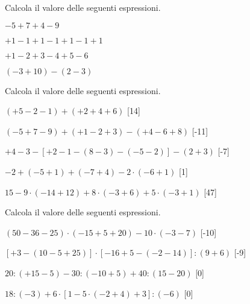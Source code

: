 \begin{esercizio}
Calcola il valore delle seguenti espressioni.
 \begin{multicols}{2}
 \begin{enumeratea}
 \item \(-5+7+4-9\)
 \item \(+1-1+1-1+1-1+1\)
 \item \(+1-2+3-4+5-6\)
 \item \((-3+10)-(2-3)\)
 \end{enumeratea}
 \end{multicols}
\end{esercizio}

\begin{esercizio} %
Calcola il valore delle seguenti espressioni.
 \begin{enumeratea}
 \item \((+5-2-1)+(+2+4+6)\) \hfill[14]
 \item \((-5+7-9)+(+1-2+3)-(+4-6+8)\) \hfill[-11]
 \item \(+4-3-[+2-1-(8-3)-(-5-2)]-(2+3)\) \hfill[-7]
 \item \(-2+(-5+1)+(-7+4)-2 \cdot (-6+1)\) \hfill[1]
 \item \(15-9 \cdot (-14+12)+8 \cdot (-3+6)+ 5 \cdot(-3+1)\) \hfill[47]
 \end{enumeratea}
\end{esercizio}

\begin{esercizio} %
Calcola il valore delle seguenti espressioni.
 \begin{enumeratea}
 \item \((50-36-25)\cdot (-15+5+20)-10\cdot (-3-7)\) \hfill[-10]
 \item \([+3-(10-5+25)]\cdot [-16+5-(-2-14)]:(9+6)\) \hfill[-9]
 \item \(20:(+15-5)-30:(-10+5)+40:(15-20)\) \hfill[0]
 \item \(18:(-3)+6\cdot [1-5\cdot (-2+4)+3]: (-6)\) \hfill[0]
\end{enumeratea}
\end{esercizio}

